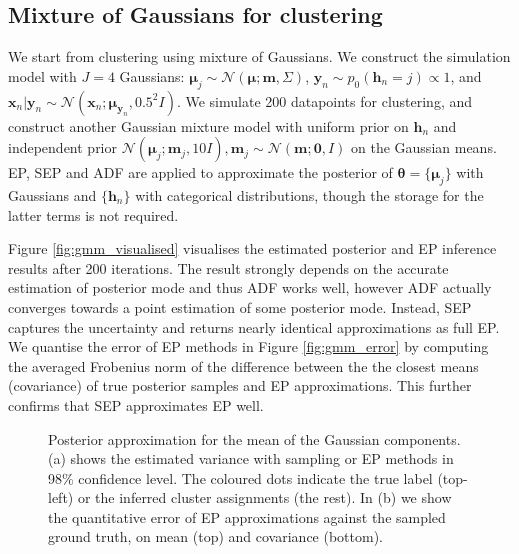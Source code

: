 \subsection{Mixture of Gaussians for clustering}
We start from clustering using mixture of Gaussians. We construct the simulation model with $J=4$ Gaussians: $\bm{\mu}_j \sim \mathcal{N}(\bm{\mu}; \bm{m}, \Sigma)$, $\bm{y}_n \sim p_0(\bm{h}_n = j) \propto 1$, and $\bm{x}_n | \bm{y}_n \sim \mathcal{N}(\bm{x}_n; \bm{\mu}_{\bm{y}_n}, 0.5^2 I)$. We simulate 200 datapoints for clustering, and construct another Gaussian mixture model with uniform prior on $\bm{h}_n$ and independent prior $\mathcal{N}(\bm{\mu}_j; \bm{m}_j, 10I), \bm{m}_j \sim \mathcal{N}(\bm{m}; \bm{0}, I)$ on the Gaussian means. EP, SEP and ADF are applied to approximate the posterior of $\bm{\theta} = \{ \bm{\mu}_j \}$ with Gaussians and $\{\bm{h}_n\}$ with categorical distributions, though the storage for the latter terms is not required. 

Figure \ref{fig:gmm_visualised} visualises the estimated posterior and EP inference results after 200 iterations. The result strongly depends on the accurate estimation of posterior mode and thus ADF works well, however ADF actually converges towards a point estimation of some posterior mode. Instead, SEP captures the uncertainty and returns nearly identical approximations as full EP. We quantise the error of EP methods in Figure \ref{fig:gmm_error} by computing the averaged Frobenius norm of the difference between the the closest means (covariance) of true posterior samples and EP approximations. This further confirms that SEP approximates EP well.

\begin{figure}
\centering
\def\svgwidth{0.50\linewidth}
\subfigure[\label{fig:gmm_visualised}]{
}
%
\hspace{0.1in}
%
\def\svgwidth{0.40\linewidth}
\subfigure[\label{fig:gmm_error}]{
}
\caption{Posterior approximation for the mean of the Gaussian components. (a) shows the estimated variance with sampling or EP methods in 98\% confidence level. The coloured dots indicate the true label (top-left) or the inferred cluster assignments (the rest). In (b) we show the quantitative error of EP approximations against the sampled ground truth, on mean (top) and covariance (bottom).}
\end{figure}
